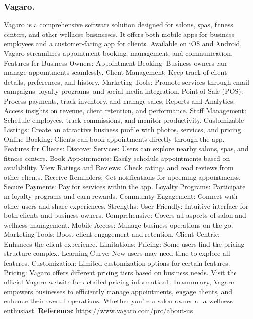 \documentclass{article}
\begin{document}
      \subsubsection{Vagaro.}
      Vagaro is a comprehensive software solution designed for salons, spas, fitness centers, and other wellness businesses.
      It offers both mobile apps for business employees and a customer-facing app for clients.
      Available on iOS and Android, Vagaro streamlines appointment booking, management, and communication.
      Features for Business Owners:
      Appointment Booking: Business owners can manage appointments seamlessly.
      Client Management: Keep track of client details, preferences, and history.
      Marketing Tools: Promote services through email campaigns, loyalty programs, and social media integration.
      Point of Sale (POS): Process payments, track inventory, and manage sales.
      Reports and Analytics: Access insights on revenue, client retention, and performance.
      Staff Management: Schedule employees, track commissions, and monitor productivity.
      Customizable Listings: Create an attractive business profile with photos, services, and pricing.
      Online Booking: Clients can book appointments directly through the app.
      Features for Clients:
      Discover Services: Users can explore nearby salons, spas, and fitness centers.
      Book Appointments: Easily schedule appointments based on availability.
      View Ratings and Reviews: Check ratings and read reviews from other clients.
      Receive Reminders: Get notifications for upcoming appointments.
      Secure Payments: Pay for services within the app.
      Loyalty Programs: Participate in loyalty programs and earn rewards.
      Community Engagement: Connect with other users and share experiences.
      Strengths:
      User-Friendly: Intuitive interface for both clients and business owners.
      Comprehensive: Covers all aspects of salon and wellness management.
      Mobile Access: Manage business operations on the go.
      Marketing Tools: Boost client engagement and retention.
      Client-Centric: Enhances the client experience.
      Limitations:
      Pricing: Some users find the pricing structure complex.
      Learning Curve: New users may need time to explore all features.
      Customization: Limited customization options for certain features.
      Pricing:
      Vagaro offers different pricing tiers based on business needs.
      Visit the official Vagaro website for detailed pricing information1.
      In summary, Vagaro empowers businesses to efficiently manage appointments, engage clients, and enhance their overall operations. Whether you’re a salon owner or a wellness enthusiast.\newline
      \textbf{Reference}: \href{https://www.vagaro.com/pro/about-us}{https://www.vagaro.com/pro/about-us}
      \pagebreak
\end{document}
